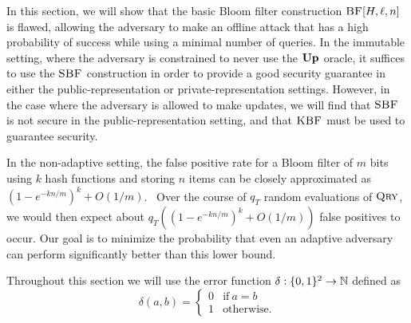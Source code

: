 In this section, we will show that the basic Bloom filter construction
$\textnormal{\textsc{BF}}[H,\ell,n]$ is flawed, allowing the adversary to make an offline attack that
has a high probability of success while using a minimal number of queries. In
the immutable setting, where the adversary is constrained to never use the
$\textup{\textbf{Up}}\hspace{0.5pt}$ oracle, it suffices to use the $\textnormal{\textsc{SBF}}$ construction in order to provide a
good security guarantee in either the public-representation or
private-representation settings. However, in the case where the adversary is
allowed to make updates, we will find that $\textnormal{\textsc{SBF}}$ is not secure in the
public-representation setting, and that $\textnormal{\textsc{KBF}}$ must be used to guarantee
security.


In the non-adaptive setting, the false positive rate for a Bloom filter of $m$
bits using $k$ hash functions and storing $n$ items can be closely approximated
as $(1-e^{-kn/m})^k + O(1/m)$.~\cite{kirsch2006less} Over the course of $q_T$
random evaluations of $\textnormal{\textsc{Qry}}$, we would then expect about
$q_T((1-e^{-kn/m})^k + O(1/m))$ false positives to occur. Our goal is to
minimize the probability that even an adaptive adversary can perform
significantly better than this lower bound.

%
Throughout this section we will use the error function $\delta:\{0,1\}^2\to\mathbb{N}$
defined as
\begin{equation*}
  \delta(a, b) =
  \begin{cases}
    0 & \text{if}\ a=b \\
    1 & \text{otherwise.}
  \end{cases}
\end{equation*}

